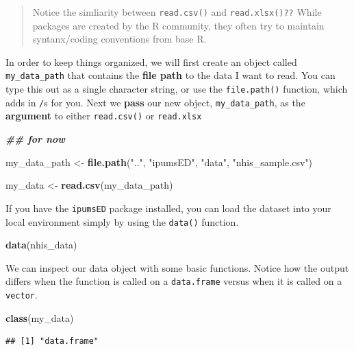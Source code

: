 \documentclass[
]{book}
\newenvironment{Shaded}{\begin{snugshade}}{\end{snugshade}}
\newcommand{\DocumentationTok}[1]{\textcolor[rgb]{0.56,0.35,0.01}{\textbf{\textit{#1}}}}
\newcommand{\FunctionTok}[1]{\textcolor[rgb]{0.13,0.29,0.53}{\textbf{#1}}}
\newcommand{\NormalTok}[1]{#1}
\newcommand{\OtherTok}[1]{\textcolor[rgb]{0.56,0.35,0.01}{#1}}
\newcommand{\StringTok}[1]{\textcolor[rgb]{0.31,0.60,0.02}{#1}}
\begin{document}
\begin{quote}
Notice the simliarity between \texttt{read.csv()} and \texttt{read.xlsx()??}
While packages are created by the R community, they often try to maintain syntanx/coding conventions from base R.
\end{quote}

In order to keep things organized, we will first create an object called \texttt{my\_data\_path} that contains the \textbf{file path} to the data I want to read. You can type this out as a single character string, or use the \texttt{file.path()} function, which adds in \texttt{/}s for you. Next we \textbf{pass} our new object, \texttt{my\_data\_path}, as the \textbf{argument} to either \texttt{read.csv()} or \texttt{read.xlsx}

\begin{Shaded}
\begin{Highlighting}[]
\DocumentationTok{\#\# for now}

\NormalTok{my\_data\_path }\OtherTok{\textless{}{-}} \FunctionTok{file.path}\NormalTok{(}\StringTok{".."}\NormalTok{, }\StringTok{"ipumsED"}\NormalTok{, }\StringTok{"data"}\NormalTok{, }\StringTok{"nhis\_sample.csv"}\NormalTok{)}


\NormalTok{my\_data }\OtherTok{\textless{}{-}} \FunctionTok{read.csv}\NormalTok{(my\_data\_path)}
\end{Highlighting}
\end{Shaded}

If you have the \texttt{ipumsED} package installed, you can load the dataset into your local environment simply by using the \texttt{data()} function.

\begin{Shaded}
\begin{Highlighting}[]
\FunctionTok{data}\NormalTok{(nhis\_data)}
\end{Highlighting}
\end{Shaded}

We can inspect our data object with some basic functions. Notice how the output differs when the function is called on a \texttt{data.frame} versus when it is called on a \texttt{vector}.

\begin{Shaded}
\begin{Highlighting}[]
\FunctionTok{class}\NormalTok{(my\_data)}
\end{Highlighting}
\end{Shaded}

\begin{verbatim}
## [1] "data.frame"
\end{verbatim}
\end{document}
